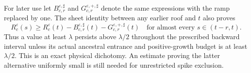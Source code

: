 For later use let $B_{c,r}^{\varepsilon,\sharp}$ and
$G_{c,r}^{\varepsilon,+,\sharp}$ denote the same expressions with
the ramp replaced by one. The sheet identity between any earlier
roof and $t$ also proves
\begin{equation}\label{eq:v93-persistence}
 R_c^\varepsilon(s)\ge R_c^\varepsilon(t)
     -B_{c,r}^{\varepsilon,\sharp}(t)
     -G_{c,r}^{\varepsilon,+,\sharp}(t)
       \quad\text{for almost every }s\in(t-r,t).
\end{equation}
Thus a value at least $\lambda$ persists above $\lambda/2$ throughout
the prescribed backward interval unless its actual ancestral entrance
and positive-growth budget is at least $\lambda/2$. This is an exact
physical dichotomy. An estimate proving the latter alternative
uniformly small is still needed for unrestricted spike exclusion.
